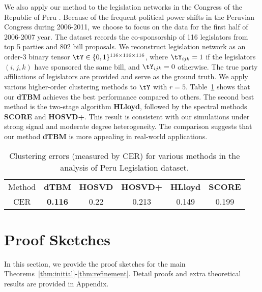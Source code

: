 \documentclass[lettersize,onecolumn,journal]{IEEEtran}
\theoremstyle{definition}
\theoremstyle{definition}
\begin{document}
We also apply our method to the legislation networks in the Congress of the Republic of Peru \citep{lee2017time}. Because of the frequent political power shifts in the Peruvian Congress during 2006-2011, we choose to focus on the data for the first half of 2006-2007 year. The dataset records the co-sponsorship of 116 legislators from top 5 parties and 802 bill proposals. We reconstruct legislation network as an order-3 binary tensor $\tY \in \{0,1\}^{116 \times 116 \times 116}$, where $\tY_{ijk} = 1$ if the legislators $(i,j,k)$ have sponsored the same bill, and $\tY_{ijk} = 0$ otherwise. The true party affiliations of legislators are provided and serve as the ground truth. We apply various higher-order clustering methods to $\tY$ with $r = 5$. Table~\ref{tab:peru} shows that our \textbf{\small dTBM} achieves the best performance compared to others. The second best method is the two-stage algorithm \textbf{\small HLloyd}, followed by the spectral methods \textbf{\small SCORE} and \textbf{\small HOSVD+}. This result is consistent with our simulations under strong signal and moderate degree heterogeneity. The comparison suggests that our method \textbf{\small dTBM} is more appealing in real-world applications.

\begin{table}[ht]
    \centering
    \begin{tabular}{c |c  c cc c}
    \hline
        Method & \textbf{\small dTBM} 
        &\textbf{\small HOSVD}
        &\textbf{\small HOSVD+} & \textbf{\small HLloyd} &  \textbf{\small SCORE}\\
         CER & \textbf{0.116}
         &  0.22 
         &0.213 & 0.149 &0.199\\
         \hline
    \end{tabular}
    \caption{Clustering errors (measured by CER) for various methods in the analysis of Peru Legislation dataset.}
    \label{tab:peru}
\end{table}



\section{Proof Sketches}\label{sec:mainproof}

In this section, we provide the proof sketches for the main Theorems~\ref{thm:initial}-\ref{thm:refinement}. Detail proofs and extra theoretical results are provided in Appendix.
\end{document}
